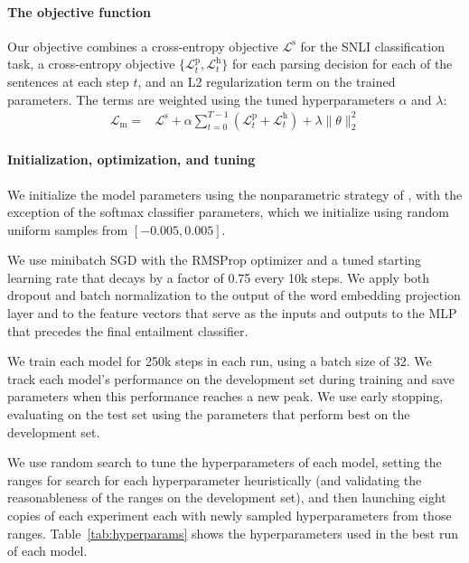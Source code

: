 \documentclass[11pt]{article}
\providecommand{\norm}[1]{\lVert#1\rVert}
\begin{document}
\paragraph{The objective function} Our objective combines a cross-entropy objective $\mathcal{L}^{\text{s}}$ for the SNLI classification task, a cross-entropy objective $\{\mathcal{L}_t^{\text{p}}, \mathcal{L}_t^{\text{h}}\}$ for each parsing decision for each of the sentences at each step $t$, and an L2 regularization term on the trained parameters. The terms are weighted using the tuned hyperparameters $\alpha$ and $\lambda$:
\begin{equation}
\begin{split}
\mathcal{L}_{\text{m}} = &\mathcal{L}^{\text{s}} + \alpha \sum_{t=0}^{T-1} (\mathcal{L}_t^{\text{p}} + \mathcal{L}_t^{\text{h}}) + \lambda \norm{\theta}^2_2
\end{split}
\end{equation}

\paragraph{Initialization, optimization, and tuning}

We initialize the model parameters using the nonparametric strategy of \citet{DBLP:journals/corr/HeZR015}, with the exception of the softmax classifier parameters, which we initialize using random uniform samples from $[-0.005, 0.005]$.
 
We use minibatch SGD with the RMSProp optimizer \citep{tieleman2012lecture} and a tuned starting learning rate that decays by a factor of 0.75 every 10k steps. We apply both dropout \citep{srivastava2014dropout} and batch normalization \citep{2015SIoffeCSzegedy} to the output of the word embedding projection layer and to the feature vectors that serve as the inputs and outputs to the MLP that precedes the final entailment classifier.

We train each model for 250k steps in each run, using a batch size of 32. We track each model's performance on the development set during training and save parameters when this performance reaches a new peak. We use early stopping, evaluating on the test set using the parameters that perform best on the development set.

We use random search to tune the hyperparameters of each model, setting the ranges for search for each hyperparameter heuristically (and validating the reasonableness of the ranges on the development set), and then launching eight copies of each experiment each with newly sampled hyperparameters from those ranges. Table~\ref{tab:hyperparams} shows the hyperparameters used in the best run of each model.
\end{document}
